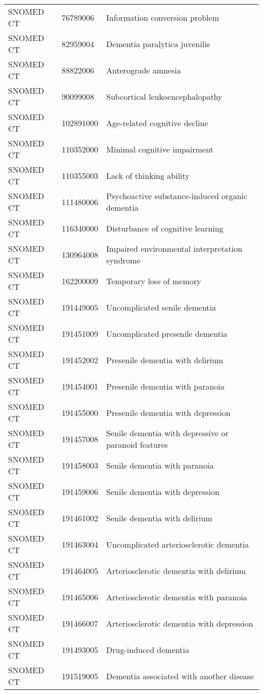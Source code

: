 \begin{longtable}{p{}p{}p{}}
  SNOMED CT & 76789006 & Information conversion problem \\ 
  SNOMED CT & 82959004 & Dementia paralytica juvenilis \\ 
  SNOMED CT & 88822006 & Anterograde amnesia \\ 
  SNOMED CT & 90099008 & Subcortical leukoencephalopathy \\ 
  SNOMED CT & 102891000 & Age-related cognitive decline \\ 
  SNOMED CT & 110352000 & Minimal cognitive impairment \\ 
  SNOMED CT & 110355003 & Lack of thinking ability \\ 
  SNOMED CT & 111480006 & Psychoactive substance-induced organic dementia \\ 
  SNOMED CT & 116340000 & Disturbance of cognitive learning \\ 
  SNOMED CT & 130964008 & Impaired environmental interpretation syndrome \\ 
  SNOMED CT & 162200009 & Temporary loss of memory \\ 
  SNOMED CT & 191449005 & Uncomplicated senile dementia \\ 
  SNOMED CT & 191451009 & Uncomplicated presenile dementia \\ 
  SNOMED CT & 191452002 & Presenile dementia with delirium \\ 
  SNOMED CT & 191454001 & Presenile dementia with paranoia \\ 
  SNOMED CT & 191455000 & Presenile dementia with depression \\ 
  SNOMED CT & 191457008 & Senile dementia with depressive or paranoid features \\ 
  SNOMED CT & 191458003 & Senile dementia with paranoia \\ 
  SNOMED CT & 191459006 & Senile dementia with depression \\ 
  SNOMED CT & 191461002 & Senile dementia with delirium \\ 
  SNOMED CT & 191463004 & Uncomplicated arteriosclerotic dementia \\ 
  SNOMED CT & 191464005 & Arteriosclerotic dementia with delirium \\ 
  SNOMED CT & 191465006 & Arteriosclerotic dementia with paranoia \\ 
  SNOMED CT & 191466007 & Arteriosclerotic dementia with depression \\ 
  SNOMED CT & 191493005 & Drug-induced dementia \\ 
  SNOMED CT & 191519005 & Dementia associated with another disease \\ 

\end{longtable}

